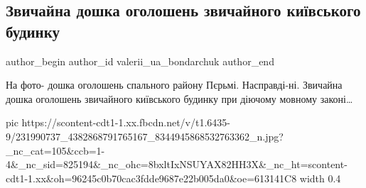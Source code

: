  
 
 
 
 
 
\subsection{Звичайна дошка оголошень звичайного київського будинку}
\label{sec:05_08_2021.fb.valerii_ua_bondarchuk.1.doska_objavlenij}
 
\ifcmt
 author_begin
   author_id valerii_ua_bondarchuk
 author_end
\fi

На фото- дошка оголошень спального району Пєрьмі. Насправді-ні. Звичайна дошка
оголошень звичайного київського будинку при діючому мовному законі…

\ifcmt
  pic https://scontent-cdt1-1.xx.fbcdn.net/v/t1.6435-9/231990737_4382868791765167_8344945868532763362_n.jpg?_nc_cat=105&ccb=1-4&_nc_sid=825194&_nc_ohc=8bxltIxNSUYAX82HH3X&_nc_ht=scontent-cdt1-1.xx&oh=96245c0b70cac3fdde9687e22b005da0&oe=613141C8
  width 0.4
\fi

